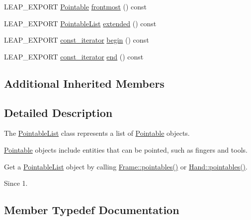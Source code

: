\begin{DoxyCompactItemize}
\item 
L\+E\+A\+P\+\_\+\+E\+X\+P\+O\+RT \hyperlink{class_leap_1_1_pointable}{Pointable} \hyperlink{class_leap_1_1_pointable_list_ab50430ce817b537ef2567eae2dc92f09}{frontmost} () const
\item 
L\+E\+A\+P\+\_\+\+E\+X\+P\+O\+RT \hyperlink{class_leap_1_1_pointable_list}{Pointable\+List} \hyperlink{class_leap_1_1_pointable_list_a47919c7b8198806da5af4c7d351d83fc}{extended} () const
\item 
L\+E\+A\+P\+\_\+\+E\+X\+P\+O\+RT \hyperlink{class_leap_1_1_pointable_list_a12b640b8c7e70885884a3a6ee903c21c}{const\+\_\+iterator} \hyperlink{class_leap_1_1_pointable_list_ad42582cce88a166f2ac21718082087ad}{begin} () const
\item 
L\+E\+A\+P\+\_\+\+E\+X\+P\+O\+RT \hyperlink{class_leap_1_1_pointable_list_a12b640b8c7e70885884a3a6ee903c21c}{const\+\_\+iterator} \hyperlink{class_leap_1_1_pointable_list_aaa748e3113d135ce8150e917f4dc9128}{end} () const
\end{DoxyCompactItemize}
\subsection*{Additional Inherited Members}


\subsection{Detailed Description}
The \hyperlink{class_leap_1_1_pointable_list}{Pointable\+List} class represents a list of \hyperlink{class_leap_1_1_pointable}{Pointable} objects.

\hyperlink{class_leap_1_1_pointable}{Pointable} objects include entities that can be pointed, such as fingers and tools.

Get a \hyperlink{class_leap_1_1_pointable_list}{Pointable\+List} object by calling \hyperlink{class_leap_1_1_frame_ae6c7c77ae805bdc6fc30381fa2b2ae3e}{Frame\+::pointables()} or \hyperlink{class_leap_1_1_hand_a845e544e674ab315f10ead9f4a7210fe}{Hand\+::pointables()}.


\begin{DoxyCodeInclude}
\end{DoxyCodeInclude}


\begin{DoxySince}{Since}
1. 
\end{DoxySince}


\subsection{Member Typedef Documentation}
\mbox{\label{class_leap_1_1_pointable_list_a12b640b8c7e70885884a3a6ee903c21c}} 
